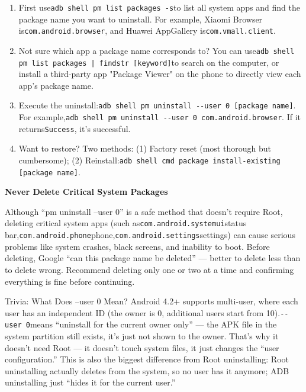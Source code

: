 \begin{enumerate}
  \item First use\texttt{adb shell pm list packages -\allowbreak s}to list all system apps and find the package name you want to uninstall. For example, Xiaomi Browser is\texttt{com.\allowbreak android.\allowbreak browser}, and Huawei AppGallery is\texttt{com.\allowbreak vmall.\allowbreak client}.
  \item Not sure which app a package name corresponds to? You can use\texttt{adb shell pm list packages | findstr [keyword]}to search on the computer, or install a third-party app "Package Viewer" on the phone to directly view each app's package name.
  \item Execute the uninstall:\texttt{adb shell pm uninstall -\allowbreak -\allowbreak user 0 [package name]}. For example,\texttt{adb shell pm uninstall -\allowbreak -\allowbreak user 0 com.\allowbreak android.\allowbreak browser}. If it returns\texttt{Success}, it's successful.
  \item Want to restore? Two methods: (1) Factory reset (most thorough but cumbersome); (2) Reinstall:\texttt{adb shell cmd package install-\allowbreak existing [package name]}.
\end{enumerate}

\textbf{Never Delete Critical System Packages}\par

Although “pm uninstall --user 0” is a safe method that doesn't require Root, deleting critical system apps (such as\texttt{com.\allowbreak android.\allowbreak systemui}status bar,\texttt{com.\allowbreak android.\allowbreak phone}phone,\texttt{com.\allowbreak android.\allowbreak settings}settings) can cause serious problems like system crashes, black screens, and inability to boot. Before deleting, Google “can this package name be deleted” — better to delete less than to delete wrong. Recommend deleting only one or two at a time and confirming everything is fine before continuing.

\begin{tcbinfo}{Trivia: What Does --user 0 Mean?}
Android 4.2+ supports multi-user, where each user has an independent ID (the owner is 0, additional users start from 10).\texttt{-\allowbreak -\allowbreak user 0}means “uninstall for the current owner only” — the APK file in the system partition still exists, it's just not shown to the owner. That's why it doesn't need Root — it doesn't touch system files, it just changes the “user configuration.” This is also the biggest difference from Root uninstalling: Root uninstalling actually deletes from the system, so no user has it anymore; ADB uninstalling just “hides it for the current user.”

\end{tcbinfo}

